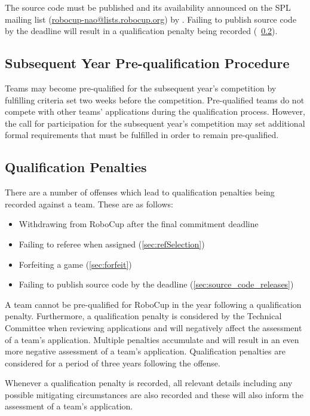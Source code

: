The source code must be published and its availability announced on the SPL mailing list (\url{robocup-nao@lists.robocup.org}) by \DTMdate{\CodeReleaseAnnouncementDate}.
Failing to publish source code by the deadline will result in a qualification penalty being recorded (\cf~\cref{sec:qualificationPenalties}).

\subsection{Subsequent Year Pre-qualification Procedure}
\label{sec:preQual}

Teams may become pre-qualified for the subsequent year's competition by fulfilling criteria set two weeks before the competition.
Pre-qualified teams do not compete with other teams' applications during the qualification process.
However, the call for participation for the subsequent year's competition may set additional formal requirements that must be fulfilled in order to remain pre-qualified.

\subsection{Qualification Penalties}
\label{sec:qualificationPenalties}

There are a number of offenses which lead to qualification penalties being recorded against a team.
These are as follows:
\begin{itemize}
  \item Withdrawing from RoboCup after the final commitment deadline
  \item Failing to referee when assigned (\cref{sec:refSelection})
  \item Forfeiting a game (\cref{sec:forfeit})
  \item Failing to publish source code by the deadline (\cref{sec:source_code_releases})
\end{itemize}

A team cannot be pre-qualified for RoboCup in the year following a qualification penalty.
Furthermore, a qualification penalty is considered by the Technical Committee when reviewing applications and will negatively affect the assessment of a team's application.
Multiple penalties accumulate and will result in an even more negative assessment of a team's application.
Qualification penalties are considered for a period of three years following the offense.

Whenever a qualification penalty is recorded, all relevant details including any possible mitigating circumstances are also recorded and these will also inform the assessment of a team's application.

